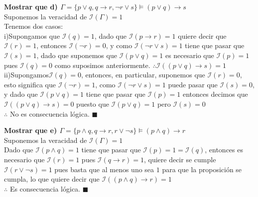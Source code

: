 \textbf{Mostrar que d) $\Gamma = \{p\lor q, q\rightarrow r, \neg r \lor s\}\vDash(p\lor q)\rightarrow s$}\\
Suponemos la veracidad de $\mathcal{I}(\Gamma)=1$\\
Tenemos dos casos:\\
\indent i)Supongamos que $\mathcal{I}(q)=1$, dado que $\mathcal{I}(p\rightarrow r)=1$ quiere decir que $\mathcal{I}(r)=1$, entonces $\mathcal{I}(\neg r)=0$, y como $\mathcal{I}(\neg r\lor s)=1$ tiene que pasar que $\mathcal{I}(s)=1$, dado que suponemos que $\mathcal{I}(p\lor q)=1$ es necesario que $\mathcal{I}(p)=1$ pues $\mathcal{I}(q)=0$ como suposimos anteriormente. $\therefore\mathcal{I}((p\lor q)\rightarrow s)=1$\\
\indent ii)Supongamos$\mathcal{I}(q)=0$, entonces, en particular, suponemos que $\mathcal{I}(r)=0$, esto significa que $\mathcal{I}(\neg r)=1$, como $\mathcal{I}(\neg r \lor s)=1$ puede pasar que $\mathcal{I}(s)=0$, y dado que $\mathcal{I}(p\lor q)=1$ tiene que pasar que $\mathcal{I}(p)=1$ entonces decimos que $\mathcal{I}((p\lor q)\rightarrow s)=0$ puesto que $\mathcal{I}(p\lor q)=1$ pero $\mathcal{I}(s)=0$\\
$\therefore$ No es consecuencia lógica. $\blacksquare$
\vspace{10px}

\textbf{Mostrar que e) $\Gamma = \{p\land q, q\rightarrow r, r \lor \neg s\}\vDash (p \land q)\rightarrow r$}\\
Suponemos la veracidad de $\mathcal{I}(\Gamma)=1$\\
Dado que $\mathcal{I}(p\land q)=1$ tiene que pasar que $\mathcal{I}(p)=1=\mathcal{I}(q)$, entonces es necesario que $\mathcal{I}(r)=1$ pues $\mathcal{I}(q\rightarrow r)=1$, quiere decir se cumple 
$\mathcal{I}(r \lor \neg s)=1$ pues basta que al menos uno sea $1$ para que la proposición se cumpla, lo que quiere decir que $\mathcal{I}((p\land q)\rightarrow r)=1$\\
$\therefore$ Es consecuencia lógica. $\blacksquare$